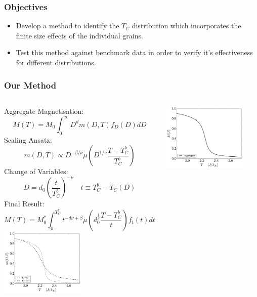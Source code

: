 \documentclass{beamer}
\begin{document}
\begin{frame}
	\frametitle{Objectives}
	\begin{itemize}
		\item{Develop a method to identify the $T_C$ distribution which incorporates the finite size effects of the individual grains.\newline}
		\item{Test this method against benchmark data in order to verify it's effectiveness for different distributions.\newline}
	\end{itemize}
\end{frame}

\begin{frame}
	\frametitle{Our Method}
	\begin{columns}
	\column{8cm}
	Aggregate Magnetisation:
	$$
	M(T) = M_0\int_0^\infty D^{d} m(D,T) f_D(D) dD
	$$
	Scaling Ansatz:
	$$
	m(D,T) \propto D^{-\beta/\nu} \mu \left(D^{1/\nu}\frac{T-T_C^b}{T_C^b}\right)
	$$
	Change of Variables:
	$$
	D = d_0\left(\frac{t}{T_C^b}\right)^{-\nu}\quad	t \equiv T_C^b - T_C(D)
	$$
	Final Result:
	$$
	M(T) = M_0^*\int_0^{T_C^b} t^{-d\nu +\beta} \mu\left(d_0^{\frac{1}{\nu}}\frac{T-T_C^b}{t}\right) f_t(t) dt
	$$
	\column{4cm}
	\includegraphics[width=4cm]{Images/Ds_noinset}
	
	\includegraphics[width=4cm]{Images/Aggregate}
	\end{columns}
\end{frame}
\end{document}
